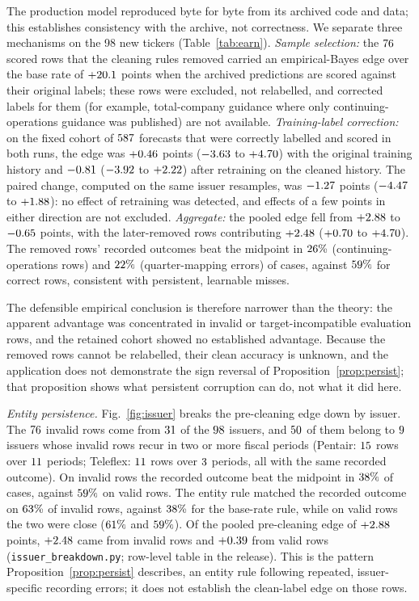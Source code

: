 \documentclass[journal]{IEEEtran}
\theoremstyle{definition}
\begin{document}
The production model reproduced byte for byte from its archived code and data; this establishes consistency with the archive, not correctness. We separate three mechanisms on the 98 new tickers (Table~\ref{tab:earn}). \emph{Sample selection:} the $76$ scored rows that the cleaning rules removed carried an empirical-Bayes edge over the base rate of $+20.1$ points when the archived predictions are scored against their original labels; these rows were excluded, not relabelled, and corrected labels for them (for example, total-company guidance where only continuing-operations guidance was published) are not available. \emph{Training-label correction:} on the fixed cohort of $587$ forecasts that were correctly labelled and scored in both runs, the edge was $+0.46$ points ($-3.63$ to $+4.70$) with the original training history and $-0.81$ ($-3.92$ to $+2.22$) after retraining on the cleaned history. The paired change, computed on the same issuer resamples, was $-1.27$ points ($-4.47$ to $+1.88$): no effect of retraining was detected, and effects of a few points in either direction are not excluded. \emph{Aggregate:} the pooled edge fell from $+2.88$ to $-0.65$ points, with the later-removed rows contributing $+2.48$ ($+0.70$ to $+4.70$). The removed rows' recorded outcomes beat the midpoint in $26\%$ (continuing-operations rows) and $22\%$ (quarter-mapping errors) of cases, against $59\%$ for correct rows, consistent with persistent, learnable misses.

The defensible empirical conclusion is therefore narrower than the theory: the apparent advantage was concentrated in invalid or target-incompatible evaluation rows, and the retained cohort showed no established advantage. Because the removed rows cannot be relabelled, their clean accuracy is unknown, and the application does not demonstrate the sign reversal of Proposition~\ref{prop:persist}; that proposition shows what persistent corruption can do, not what it did here.

\emph{Entity persistence.} Fig.~\ref{fig:issuer} breaks the pre-cleaning edge down by issuer. The $76$ invalid rows come from $31$ of the $98$ issuers, and $50$ of them belong to $9$ issuers whose invalid rows recur in two or more fiscal periods (Pentair: $15$ rows over $11$ periods; Teleflex: $11$ rows over $3$ periods, all with the same recorded outcome). On invalid rows the recorded outcome beat the midpoint in $38\%$ of cases, against $59\%$ on valid rows. The entity rule matched the recorded outcome on $63\%$ of invalid rows, against $38\%$ for the base-rate rule, while on valid rows the two were close ($61\%$ and $59\%$). Of the pooled pre-cleaning edge of $+2.88$ points, $+2.48$ came from invalid rows and $+0.39$ from valid rows (\texttt{issuer\_breakdown.py}; row-level table in the release). This is the pattern Proposition~\ref{prop:persist} describes, an entity rule following repeated, issuer-specific recording errors; it does not establish the clean-label edge on those rows.
\end{document}

